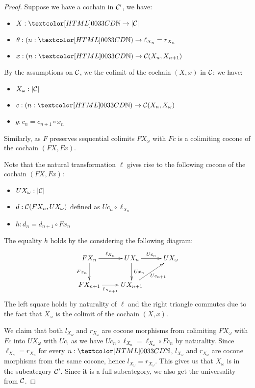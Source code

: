\begin{proof}
  Suppose we have a cochain in $\mathcal{C}'$, \ie we have:
  \begin{itemize}
  \item $X : \natty \to | \Cc |$
  \item $\theta : (n : \natty) \to \ell_{X_n} = r_{X_n}$
  \item $x : (n : \natty) \to \Cc(X_n,X_{n+1})$
  \end{itemize}

  By the assumptions on $\mathcal{C}$, we the colimit of the cochain $(X,x)$ in $\mathcal{C}$: we have:
  \begin{itemize}
  \item $X_{\omega} : | \mathcal{C} |$
  \item $c : (n : \natty) \to \Cc(X_n, X_{\omega})$
  \item $g : c_n = c_{n+1} \circ x_n$
  \end{itemize}
  Similarly, as $F$ preserves sequential colimits $F X_{\omega}$ with
  $Fc$ is a colimiting cocone of the cochain $(FX, Fx)$.

  Note that the natural transformation $\ell$ gives rise to the
  following cocone of the cochain $(FX,Fx)$:
  \begin{itemize}
  \item $U X_{\omega} : | \mathcal{C} |$
  \item $d : \mathcal{C}(FX_n , UX_{\omega})$ defined as
    $U c_n \circ \ell_{X_n}$
    \item $h : d_n = d_{n+1} \circ Fx_n$
  \end{itemize}
  The equality $h$ holds by the considering the following diagram:
  $$
  \xymatrix{
    FX_n
    \ar[r]^{\ell_{X_n}}
    \ar[d]_{F x_n}
    &UX_n
    \ar[d]^{U x_n}
    \ar[r]^{U c_n}
    &UX_{\omega}
    \\
    FX_{n+1}
    \ar[r]_{\ell_{X_{n+1}}}
    &UX_{n+1}
    \ar[ru]_{U c_{n+1}}
  }
  $$
  The left square holds by naturality of $\ell$ and the right triangle
  commutes due to the fact that $X_{\omega}$ is the colimit of the
  cochain $(X,x)$.

  We claim that both $l_{X_{\omega}}$ and $r_{X_{\omega}}$ are cocone
  morphisms from colimiting $FX_{\omega}$ with $Fc$ into $UX_{\omega}$
  with $Uc$, as we have
  $Uc_n \circ \ell_{X_n} = \ell_{X_{\omega}} \circ Fc_n$ by
  naturality. Since $\ell_{X_n} = r_{X_n}$ for every $n : \natty$,
  $l_{X_{\omega}}$ and $r_{X_{\omega}}$ are cocone morphisms from the
  same cocone, hence $l_{X_{\omega}} = r_{X_{\omega}}$. This gives us
  that $X_{\omega}$ is in the subcategory $\mathcal{C}'$. Since it is a full
  subcategory, we also get the universality from $\mathcal{C}$.
\end{proof}
